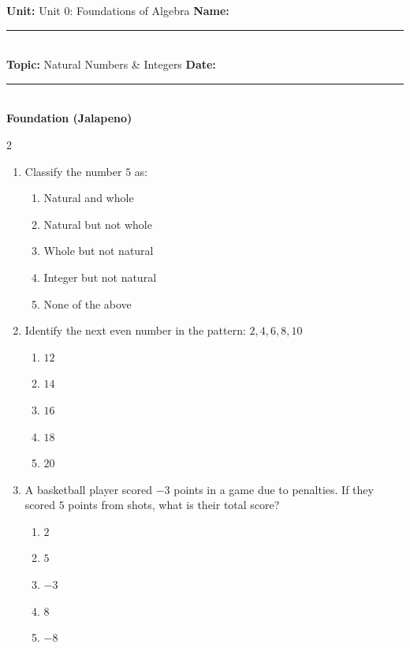 \documentclass[10pt]{article}
\begin{document}
\enlargethispage{2.5cm}

\begin{tcolorbox}[colback=mainblue!5, colframe=mainblue, sharp corners, boxrule=0.5pt]
    \small \textbf{Unit:} Unit 0: Foundations of Algebra \hfill \textbf{Name:} \rule{3cm}{0.4pt} \\
    \small \textbf{Topic:} Natural Numbers & Integers \hfill \textbf{Date:} \rule{2cm}{0.4pt} \\
    \centering \textbf{\large Foundation (Jalapeno)}
\end{tcolorbox}

\vspace{0.2cm}

\begin{multicols}{2}
\begin{enumerate}[label=\textbf{Q\arabic*.}, leftmargin=*, itemsep=6pt, parsep=0pt]

  \item \small Classify the number $5$ as:
  \begin{enumerate}[label=(\Alph*), leftmargin=0.6cm, nosep, itemsep=2pt]
    \item Natural and whole
    \item Natural but not whole
    \item Whole but not natural
    \item Integer but not natural
    \item None of the above
  \end{enumerate}

  \item \small Identify the next even number in the pattern: $2, 4, 6, 8, 10$
  \begin{enumerate}[label=(\Alph*), leftmargin=0.6cm, nosep, itemsep=2pt]
    \item $12$
    \item $14$
    \item $16$
    \item $18$
    \item $20$
  \end{enumerate}

  \item \small A basketball player scored $-3$ points in a game due to penalties. If they scored $5$ points from shots, what is their total score?
  \begin{enumerate}[label=(\Alph*), leftmargin=0.6cm, nosep, itemsep=2pt]
    \item $2$
    \item $5$
    \item $-3$
    \item $8$
    \item $-8$
  \end{enumerate}


\end{enumerate}
\end{multicols}
\end{document}
